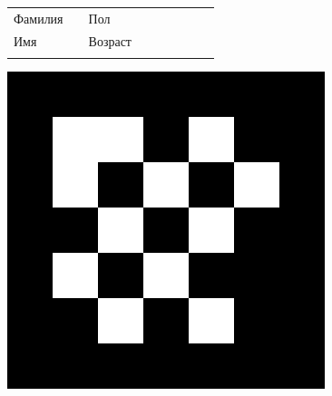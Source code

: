 \documentclass[12pt, a4paper]{article}
\begin{document}
\newpage

\renewcommand{\arraystretch}{1.5}

\begin{figure}[t]
\scriptsize 
\begin{tabular}[b]{ V{2.8} m{2.0cm} V{2.8} m{6.2cm} V{2.8} m{2cm} V{2.8} m{5.85cm} V{2.8} } 
Фамилия &  & Пол & \\  [0.45cm]
Имя &  & Возраст & \\  [0.45cm]

\end{tabular}
\includegraphics[scale=0.16]{imgs/marker_2773}
\end{figure}

\setlength{\textfloatsep}{5pt plus 1.0pt minus 1.0pt}
\end{document}
